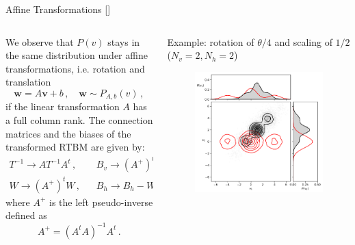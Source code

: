 \documentclass[10pt]{beamer}
\begin{document}
\begin{frame}{Affine Transformations \hfill \small [\cite{Carrazza:2018nmd}]}
    \begin{columns}
        \begin{column}{0.5 \textwidth}
            We observe that $P(v)$ stays in the same distribution under affine
            transformations, i.e. rotation and translation
            $$
            \mathbf w = A \mathbf v+b\,, \quad \mathbf w \sim P_{A,b}(v)\,,
            $$
            if the linear transformation $A$ has a full column rank.
            The connection matrices and the biases of the transformed RTBM are given by:
            \begin{equation*}
            \begin{split}
            T^{-1}\rightarrow AT^{-1}A^t\,,&\,\,\,\,\, B_v \rightarrow (A^+)^t B_v-Tb\,,\\
            W\rightarrow (A^+)^t W\,,&\,\,\,\,\, B_h\rightarrow B_h - W^tb \,.
            \end{split}
            \end{equation*}
            where $A^+$ is the left pseudo-inverse defined as
            \begin{equation*}\label{leftinverse}
            A^+ = (A^t A)^{-1}A^t\,.
            \end{equation*}
        \end{column}
        \begin{column}{0.5 \textwidth}
            \centering
            Example: rotation of $\theta / 4$ and scaling of $1/2$ ($N_v = 2, N_h =2 $)
    \begin{figure}
        \begin{center}
          \includegraphics[scale=0.4]{figures/rotation2d.pdf}

\end{center}
\end{figure}
\end{column}
\end{columns}
\end{frame}
\end{document}
